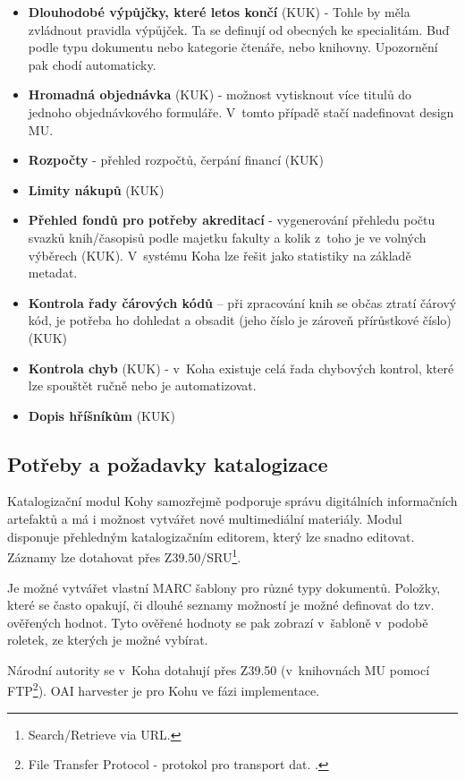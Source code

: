 \documentclass[
	11pt, oneside, printed, final, palatino, monochrome
	microtype,
	table,   %
	lof,     %
	lot     %
]{fithesis3}
\newcommand{\bold}[1]{\textbf{#1}}
\begin{document}
{\begin{itemize}
\item \bold{Dlouhodobé výpůjčky, které letos končí} (KUK) - Tohle by měla zvládnout pravidla výpůjček. Ta se definují od obecných ke specialitám. Buď podle typu dokumentu nebo kategorie čtenáře, nebo knihovny. Upozornění pak chodí automaticky.
\item \bold{Hromadná objednávka} (KUK) - možnost vytisknout více titulů do jednoho objednávkového formuláře. V~tomto případě stačí nadefinovat design MU.
\item \bold{Rozpočty} - přehled rozpočtů, čerpání financí (KUK)
\item \bold{Limity nákupů} (KUK)
\item \bold{Přehled fondů pro potřeby akreditací} - vygenerování přehledu počtu svazků knih/časopisů podle majetku fakulty a kolik z~toho je ve volných výběrech (KUK). V~systému Koha lze řešit jako statistiky na základě metadat.
\item \bold{Kontrola řady čárových kódů} – při zpracování knih se občas ztratí čárový kód, je potřeba ho dohledat a obsadit (jeho číslo je zároveň přírůstkové číslo) (KUK)
\item \bold{Kontrola chyb} (KUK) - v~Koha existuje celá řada chybových kontrol, které lze spouštět ručně nebo je automatizovat.
\item \bold{Dopis hříšníkům} (KUK)
\end{itemize}

\subsection{Potřeby a požadavky katalogizace}

Katalogizační modul Kohy samozřejmě podporuje správu digitálních informačních artefaktů a má i možnost vytvářet nové multimediální materiály. Modul disponuje přehledným katalogizačním editorem, který lze snadno editovat. Záznamy lze dotahovat přes Z39.50/SRU\footnote{Search/Retrieve via URL.}. 

Je možné vytvářet vlastní MARC šablony pro různé typy dokumentů. Položky, které se často opakují, či dlouhé seznamy možností je možné definovat do tzv. ověřených hodnot. Tyto ověřené hodnoty se pak zobrazí v~šabloně v~podobě roletek, ze kterých je možné vybírat.

Národní autority se v~Koha dotahují přes Z39.50 (v~knihovnách MU pomocí FTP\footnote{File Transfer Protocol - protokol pro transport dat.
.}). OAI harvester je pro Kohu ve fázi implementace.

}
\end{document}
